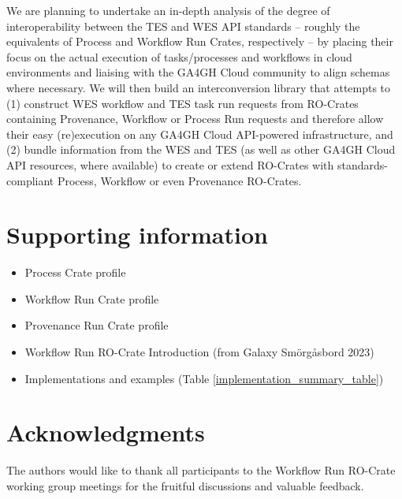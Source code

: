 \documentclass[10pt,letterpaper]{article}
\begin{document}
We are planning to undertake an in-depth analysis of the degree of interoperability between the TES and WES API standards -- roughly the equivalents of Process and Workflow Run Crates, respectively – by placing their focus on the actual execution of tasks/processes and workflows in cloud environments and liaising with the GA4GH Cloud community to align schemas where necessary.
We will then build an interconversion library that attempts to (1) construct WES workflow and TES task run requests from RO-Crates containing Provenance, Workflow or Process Run requests and therefore allow their easy (re)execution on any GA4GH Cloud API-powered infrastructure, and (2) bundle information from the WES and TES (as well as other GA4GH Cloud API resources, where available) to create or extend RO-Crates with standards-compliant Process, Workflow or even Provenance RO-Crates.



\section*{Supporting information}

\begin{itemize}
    \item Process Crate profile \cite{WRROC 2023a}
    \item Workflow Run Crate profile \cite{WRROC 2023b}
    \item Provenance Run Crate profile \cite{WRROC 2023c}
    \item Workflow Run RO-Crate Introduction \cite{runcrate-intro} (from Galaxy Smörgåsbord 2023) 
    \item Implementations and examples (Table \ref{implementation_summary_table})
\end{itemize}


\section*{Acknowledgments}

The authors would like to thank all participants to the Workflow Run
RO-Crate working group meetings for the fruitful discussions and
valuable feedback.
\end{document}
